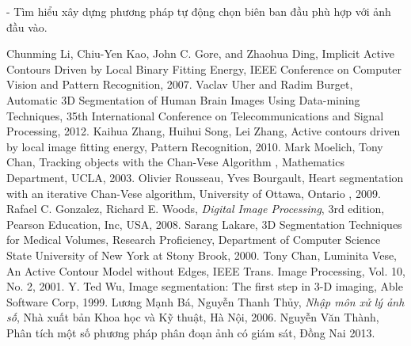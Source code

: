 \documentclass[12pt, oneside, a4paper]{book}
\begin{document}
- Tìm hiểu xây dựng phương pháp tự động chọn biên ban đầu phù hợp với ảnh đầu vào.
\newpage
\begin{thebibliography}{7}
Chunming Li, Chiu-Yen Kao, John C. Gore, and Zhaohua Ding, Implicit Active Contours Driven by Local Binary Fitting Energy,  IEEE Conference on Computer Vision and Pattern Recognition, 2007.
Vaclav Uher and Radim Burget, Automatic 3D Segmentation of Human Brain
Images Using Data-mining Techniques, 35th International Conference on Telecommunications and Signal Processing, 2012.
Kaihua Zhang, Huihui Song, Lei Zhang, Active contours driven by local image fitting energy, Pattern Recognition, 2010.
Mark Moelich, Tony Chan, Tracking objects with the Chan-Vese Algorithm , Mathematics Department, UCLA, 2003.
Olivier Rousseau, Yves Bourgault,  Heart segmentation with an iterative Chan-Vese
algorithm, University of Ottawa, Ontario , 2009.
Rafael C. Gonzalez, Richard E. Woods, \textsl{Digital Image Processing}, 3rd edition, Pearson Education, Inc, USA, 2008.
Sarang Lakare,  3D Segmentation Techniques for Medical Volumes, Research Proficiency, Department of Computer Science State University of New York at Stony Brook, 2000.
Tony Chan, Luminita Vese, An Active Contour Model without Edges, IEEE Trans. Image
Processing, Vol. 10, No. 2,  2001.
Y. Ted Wu, Image segmentation: The first step in 3-D imaging, Able Software Corp,  1999.
Lương Mạnh Bá, Nguyễn Thanh Thủy, \textsl{Nhập môn xử lý ảnh số}, Nhà xuất bản Khoa học và Kỹ thuật, Hà Nội, 2006.
Nguyễn Văn Thành, Phân tích một số phương pháp phân đoạn ảnh có giám sát, Đồng Nai 2013.

\end{thebibliography}
\thispagestyle{empty}
\end{document}
